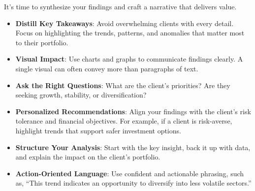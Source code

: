 \documentclass[11pt]{article}
\begin{document}
It's time to synthesize your findings and craft a narrative that delivers
value.


\begin{itemize}[leftmargin=1.5em, itemsep=2pt]
  \item \textbf{Distill Key Takeaways}: Avoid overwhelming clients with every
  detail. Focus on highlighting the trends, patterns, and anomalies that
  matter most to their portfolio.
  \item \textbf{Visual Impact}: Use charts and graphs to communicate findings
  clearly. A single visual can often convey more than paragraphs of text.
\end{itemize}

\begin{itemize}[leftmargin=1.5em, itemsep=2pt]
  \item \textbf{Ask the Right Questions}: What are the client's priorities?
  Are they seeking growth, stability, or diversification?
  \item \textbf{Personalized Recommendations}: Align your findings with the
  client's risk tolerance and financial objectives. For example, if a client
  is risk-averse, highlight trends that support safer investment options.
\end{itemize}

\begin{itemize}[leftmargin=1.5em, itemsep=2pt]
  \item \textbf{Structure Your Analysis}: Start with the key insight, back it
  up with data, and explain the impact on the client's portfolio.
  \item \textbf{Action-Oriented Language}: Use confident and actionable
  phrasing, such as, ``This trend indicates an opportunity to diversify into
  less volatile sectors.''
\end{itemize}


\end{document}
